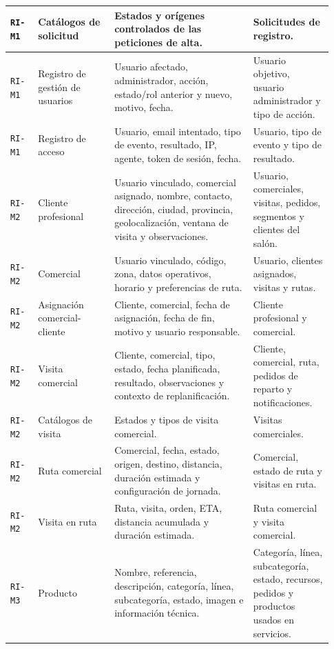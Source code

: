 {\begin{supertabular}{|>{\raggedright\arraybackslash}p{0.08\linewidth}|>{\raggedright\arraybackslash}p{0.22\linewidth}|>{\raggedright\arraybackslash}p{0.40\linewidth}|>{\raggedright\arraybackslash}p{0.23\linewidth}|}
\hline
\texttt{RI-M1} & Catálogos de solicitud & Estados y orígenes controlados de las peticiones de alta. & Solicitudes de registro. \\
\hline
\texttt{RI-M1} & Registro de gestión de usuarios & Usuario afectado, administrador, acción, estado/rol anterior y nuevo, motivo, fecha. & Usuario objetivo, usuario administrador y tipo de acción. \\
\hline
\texttt{RI-M1} & Registro de acceso & Usuario, email intentado, tipo de evento, resultado, IP, agente, token de sesión, fecha. & Usuario, tipo de evento y tipo de resultado. \\
\hline
{}
\texttt{RI-M2} & Cliente profesional & Usuario vinculado, comercial asignado, nombre, contacto, dirección, ciudad, provincia, geolocalización, ventana de visita y observaciones. & Usuario, comerciales, visitas, pedidos, segmentos y clientes del salón. \\
\hline
\texttt{RI-M2} & Comercial & Usuario vinculado, código, zona, datos operativos, horario y preferencias de ruta. & Usuario, clientes asignados, visitas y rutas. \\
\hline
\texttt{RI-M2} & Asignación comercial-cliente & Cliente, comercial, fecha de asignación, fecha de fin, motivo y usuario responsable. & Cliente profesional y comercial. \\
\hline
\texttt{RI-M2} & Visita comercial & Cliente, comercial, tipo, estado, fecha planificada, resultado, observaciones y contexto de replanificación. & Cliente, comercial, ruta, pedidos de reparto y notificaciones. \\
\hline
\texttt{RI-M2} & Catálogos de visita & Estados y tipos de visita comercial. & Visitas comerciales. \\
\hline
\texttt{RI-M2} & Ruta comercial & Comercial, fecha, estado, origen, destino, distancia, duración estimada y configuración de jornada. & Comercial, estado de ruta y visitas en ruta. \\
\hline
\texttt{RI-M2} & Visita en ruta & Ruta, visita, orden, ETA, distancia acumulada y duración estimada. & Ruta comercial y visita comercial. \\
\hline
{}
\texttt{RI-M3} & Producto & Nombre, referencia, descripción, categoría, línea, subcategoría, estado, imagen e información técnica. & Categoría, línea, subcategoría, estado, recursos, pedidos y productos usados en servicios. \\
\hline

\end{supertabular}}
